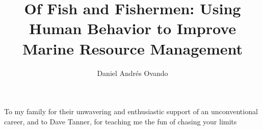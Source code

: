 \documentclass[twoside,12pt,final]{ucthesis-CA2012}
\begin{document}
\begin{ucfrontmatter}


  \title{Of Fish and Fishermen: Using Human Behavior to Improve Marine Resource
Management}

  \author{Daniel Andrés Ovando}

     


	\maketitle
	\approvalpage
	\copyrightpage

    \begin{dedication}

      \vspace*{25ex}
      \begin{center}
      \begin{Large}

        To my family for their unwavering and enthusiastic support of an
        unconventional career, and to Dave Tanner, for teaching me the fun of
        chasing your limits


\end{Large}
\end{center}
\end{dedication}
\end{ucfrontmatter}
\end{document}
